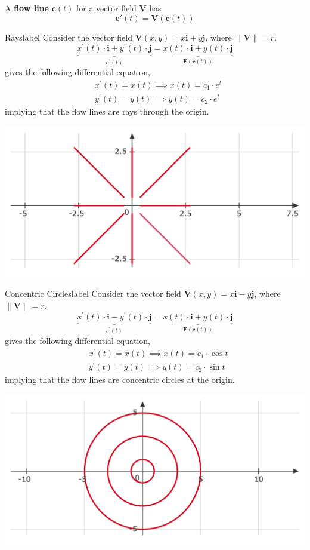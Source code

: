 \begin{defn}
	A \textbf{flow line} $\mathbf{c}(t)$ for a vector field $\mathbf{V}$ has
	\[\mathbf{c}'(t) = \mathbf{V}(\mathbf{c}(t))\]
\end{defn}

\begin{ex}{Rays}{label}
	Consider the vector field $\mathbf{V}(x, y) = x \mathbf{i} + y \mathbf{j}$, where $\|\mathbf{V}\| = r$.
	\[\underbrace{x^{\prime}(t) \cdot \mathbf{i}+y^{\prime}(t) \cdot \mathbf{j}}_{\mathbf{c}^{\prime}(t)}=\underbrace{x(t) \cdot \mathbf{i}+y(t) \cdot \mathbf{j}}_{\mathbf{F}(\mathbf{c}(t))}\]
	gives the following differential equation,
	\begin{align*}
	&x^{\prime}(t)=x(t) \implies x(t) = c_1 \cdot e^t\\
	&y^{\prime}(t)=y(t) \implies y(t) = c_2 \cdot e^t
	\end{align*}
	implying that the flow lines are rays through the origin.
	\begin{center}
	    \includegraphics[width=0.7\linewidth]{figures/wk-6/fig-4.png}
	\end{center}
\end{ex}

\begin{ex}{Concentric Circles}{label}
	Consider the vector field $\mathbf{V}(x, y) = x \mathbf{i} - y \mathbf{j}$, where $\|\mathbf{V}\| = r$.
	\[\underbrace{x^{\prime}(t) \cdot \mathbf{i}-y^{\prime}(t) \cdot \mathbf{j}}_{c^{\prime}(t)}=\underbrace{x(t) \cdot \mathbf{i}+y(t) \cdot \mathbf{j}}_{\mathbf{F}(\mathbf{c}(t))}\]
	gives the following differential equation,
	\begin{align*}
	&x^{\prime}(t)=x(t) \implies x(t) = c_1 \cdot \cos t\\
	&y^{\prime}(t)=y(t) \implies y(t) = c_2 \cdot \sin t
	\end{align*}
	implying that the flow lines are concentric circles at the origin.
	\begin{center}
	    \includegraphics[width=0.7\linewidth]{figures/wk-6/fig-5.png}
	\end{center}
\end{ex}

